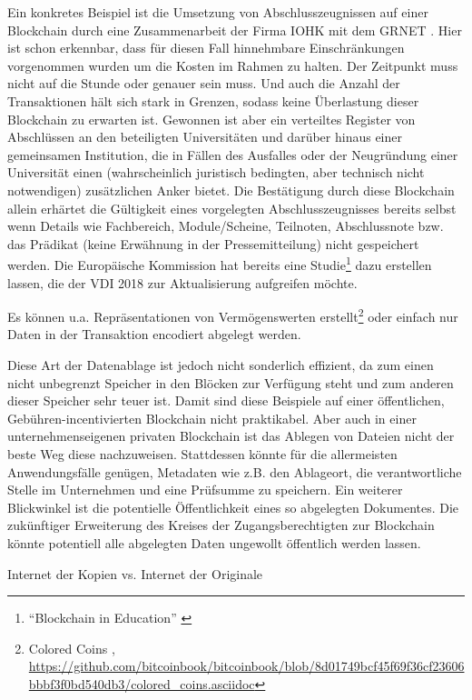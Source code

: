 Ein konkretes Beispiel ist die Umsetzung von Abschlusszeugnissen auf einer Blockchain durch eine Zusammenarbeit der Firma IOHK mit dem \gls{GRNET} \autocite{w:abschluesse-blockchain}. Hier ist schon erkennbar, dass für diesen Fall hinnehmbare Einschränkungen vorgenommen wurden um die Kosten im Rahmen zu halten. Der Zeitpunkt muss nicht auf die Stunde oder genauer sein muss. Und auch die Anzahl der Transaktionen hält sich stark in Grenzen, sodass keine Überlastung dieser Blockchain zu erwarten ist. Gewonnen ist aber ein verteiltes Register von Abschlüssen an den beteiligten Universitäten und darüber hinaus einer gemeinsamen Institution, die in Fällen des Ausfalles oder der Neugründung einer Universität einen (wahrscheinlich juristisch bedingten, aber technisch nicht notwendigen) zusätzlichen Anker bietet. Die Bestätigung durch diese Blockchain allein erhärtet die Gültigkeit eines vorgelegten Abschlusszeugnisses bereits selbst wenn Details wie Fachbereich, Module/Scheine, Teilnoten, Abschlussnote bzw. das Prädikat (keine Erwähnung in der Pressemitteilung) nicht gespeichert werden. Die Europäische Kommission hat bereits eine Studie\footnote{\enquote{Blockchain in Education} \autocite{p:bc-edu-eurocommission}} dazu erstellen lassen, die der \gls{VDI} 2018 zur Aktualisierung aufgreifen möchte.

Es können u.a. Repräsentationen von Vermögenswerten erstellt\footnote{Colored Coins \autocite{b:mastering-bitcoin}, \url{https://github.com/bitcoinbook/bitcoinbook/blob/8d01749bcf45f69f36cf23606bbbf3f0bd540db3/colored_coins.asciidoc}} oder einfach nur Daten in der Transaktion encodiert abgelegt werden.

Diese Art der Datenablage ist jedoch nicht sonderlich effizient, da zum einen nicht unbegrenzt Speicher in den Blöcken zur Verfügung steht und zum anderen dieser Speicher sehr teuer ist. Damit sind diese Beispiele auf einer öffentlichen, Gebühren-incentivierten Blockchain nicht praktikabel. Aber auch in einer unternehmenseigenen privaten Blockchain ist das Ablegen von Dateien nicht der beste Weg diese nachzuweisen. Stattdessen könnte für die allermeisten Anwendungsfälle genügen, Metadaten wie z.B. den Ablageort, die verantwortliche Stelle im Unternehmen und eine Prüfsumme zu speichern. Ein weiterer Blickwinkel ist die potentielle Öffentlichkeit eines so abgelegten Dokumentes. Die zukünftiger Erweiterung des Kreises der Zugangsberechtigten zur Blockchain könnte potentiell alle abgelegten Daten ungewollt öffentlich werden lassen.

Internet der Kopien vs. Internet der Originale



